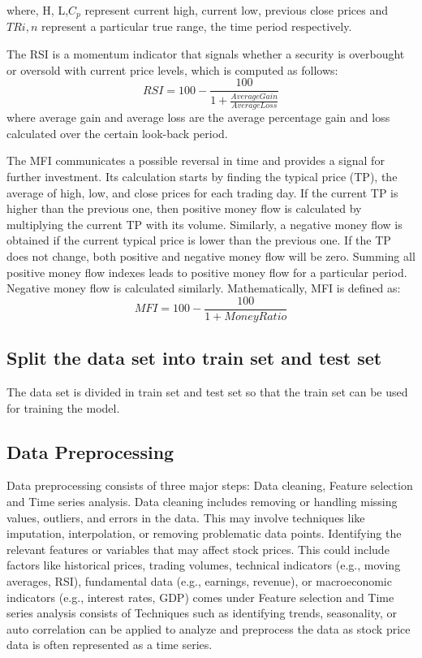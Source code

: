 where, H, L,$ C_p$ represent current high, current low, previous close prices and $T Ri, n$ represent a particular true range, the time period respectively.
\par 
The RSI is a momentum indicator that signals whether a security is overbought or oversold with current price levels, which is computed as follows:
\begin{equation}
RSI = 100 -\frac{100}{1 + \frac{Average Gain}{Average Loss}}
\end{equation}
where average gain and average loss are the average percentage gain and loss calculated over the certain look-back period.
\par 
The MFI communicates a possible reversal in time and provides a signal for further investment. Its calculation starts by finding the typical price (TP), the average of high, low, and close prices for each trading day. If the current TP is higher than the previous one, then positive money flow is calculated by multiplying the current TP with its volume. Similarly, a negative money flow is obtained if the current typical price is lower than the previous one. If the TP does not change, both positive and negative money flow will be zero. Summing all positive money flow indexes leads to positive money flow for a particular period. Negative money flow is calculated similarly. Mathematically, MFI is defined as: 
\begin{equation}
MFI = 100 - \frac{100}{1 + Money Ratio}
\end{equation}
\subsection{Split the data set into train set and test set}
\vspace{-18pt}
The data set is divided in train set and test set so that the train set can be used for training the model.
\subsection{Data Preprocessing}
\vspace{-18pt}
Data preprocessing consists of three major steps: Data cleaning, Feature selection and Time series analysis. Data cleaning includes removing or handling missing values, outliers, and errors in the data. This may involve techniques like imputation, interpolation, or removing problematic data points. Identifying the relevant features or variables that may affect stock prices. This could include factors like historical prices, trading volumes, technical indicators (e.g., moving averages, RSI), fundamental data (e.g., earnings, revenue), or macroeconomic indicators (e.g., interest rates, GDP) comes under Feature selection and Time series analysis consists of Techniques such as identifying trends, seasonality, or auto correlation can be applied to analyze and preprocess the data as stock price data is often represented as a time series. 
